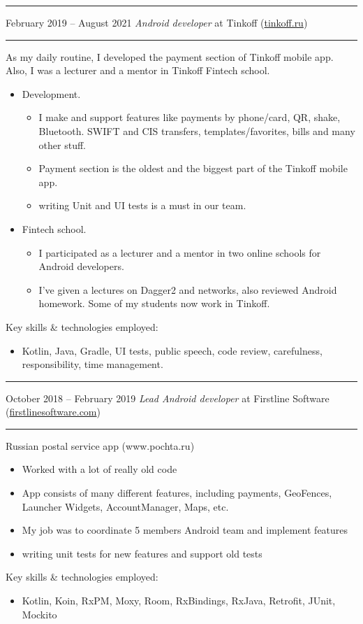 \documentclass[11pt]{article}
\newcommand\CvSmallSkipLength{0.5em}
\newcommand\CvSkip[1]{\vspace{#1}}
\newcommand\CvSmallSkip{\CvSkip{\CvSmallSkipLength}}
\newcommand\CvRule{\begingroup\color{CvRuleColor}\hrule\endgroup}
\newcommand\CvWorkplaceHeader[5]{\begingroup%
	\CvRule%
	\fboxsep0pt%
	\colorbox{CvWorkplaceHeaderColor}{%
		\begin{minipage}{\linewidth-2\fboxsep}%
			\CvSmallSkip%
			#1 -- #2 \hfill \textit{#3} at #4 (\href{http://#5/}{#5})%
			\CvSmallSkip%
		\end{minipage}%
	}%
	\CvRule%
	\endgroup%
}
\newenvironment{CvWorkplaceDescription}{%
	\begingroup\setlength\parskip{\CvSmallSkipLength}%
}{%
	\CvSmallSkip\endgroup%
}
\begin{document}
	\CvWorkplaceHeader{February 2019}{August 2021}{Android developer}{Tinkoff}{tinkoff.ru}
	\begin{CvWorkplaceDescription}
		As my daily routine, I developed the payment section of Tinkoff mobile app. Also, I was a lecturer and a mentor in Tinkoff Fintech school.
		\begin{itemize}[noitemsep]
			\item Development.
			\begin{itemize}
				\item I make and support features like payments by phone/card, QR, shake, Bluetooth. SWIFT and CIS transfers, templates/favorites, bills and many other stuff.
				\item Payment section is the oldest and the biggest part of the Tinkoff mobile app.
				\item writing Unit and UI tests is a must in our team.
			\end{itemize}
			
			\item Fintech school.
			\begin{itemize}
				\item I participated as a lecturer and a mentor in two online schools for Android developers. 
				\item I've given a lectures on Dagger2 and networks, also reviewed Android homework. Some of my students now work in Tinkoff. 
			\end{itemize}
		\end{itemize}
		
		Key skills \& technologies employed:
		\begin{itemize}[noitemsep]
			\item Kotlin, Java, Gradle, UI tests, public speech, code review, carefulness, responsibility, time management. 
		\end{itemize}
		
		
	\end{CvWorkplaceDescription}
	
	\CvWorkplaceHeader{October 2018}{February 2019}{Lead Android developer}{Firstline Software}{firstlinesoftware.com}
	\begin{CvWorkplaceDescription}
		 Russian postal service app (www.pochta.ru)
		\begin{itemize}
			\item  Worked with a lot of really old code
			\item  App consists of many different features, including payments, GeoFences, Launcher Widgets, AccountManager, Maps, etc.
			\item My job was to coordinate 5 members Android team and implement features
			\item writing unit tests for new features and support old tests
		\end{itemize}

		
		Key skills \& technologies employed:
		\begin{itemize}[noitemsep]
			\item Kotlin, Koin, RxPM, Moxy, Room, RxBindings, RxJava, Retrofit, JUnit, Mockito
		\end{itemize}
	\end{CvWorkplaceDescription}
	
\end{document}
